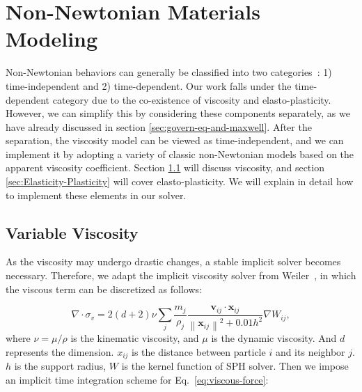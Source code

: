 \documentclass[10pt,journal,compsoc]{IEEEtran}
\begin{document}

\section{Non-Newtonian Materials Modeling}\label{sec:Non-Newtonian model}


Non-Newtonian behaviors can generally be classified into two categories~\cite{Phan2017,Chhabra2010}: 1) time-independent and 2) time-dependent. Our work falls under the time-dependent category due to the co-existence of viscosity and elasto-plasticity. However, we can simplify this by considering these components separately, as we have already discussed in section \ref{sec:govern-eq-and-maxwell}.
After the separation, the viscosity model can be viewed as time-independent, and we can implement it by adopting a variety of classic non-Newtonian models based on the apparent viscosity coefficient. Section \ref{sec:variable-viscosity} will discuss viscosity, and section \ref{sec:Elasticity-Plasticity} will cover elasto-plasticity. We will explain in detail how to implement these elements in our solver.




\subsection{Variable Viscosity}\label{sec:variable-viscosity}


As the viscosity may undergo drastic changes, a stable implicit solver becomes necessary. Therefore, we adapt the implicit viscosity solver from Weiler~\cite{Weiler2018-viscosity}, in which the viscous term can be discretized as follows:


\begin{equation}
	\nabla \cdot \sigma_v= 2(d+2) \nu \sum_j \frac{m_j}{\rho_j} \frac{\mathbf{v}_{i j} \cdot \mathbf{x}_{i j}}{\left\|\mathbf{x}_{i j}\right\|^2+0.01 h^2} \nabla W_{i j}\label{eq:viscous-force},
\end{equation}
where $\nu=\mu / \rho$ is the kinematic viscosity, and $\mu$ is the dynamic viscosity. And $d$ represents the dimension. $x_{ij}$ is the distance between particle $i$ and its neighbor $j$. $h$ is the support radius, $W$ is the kernel function of SPH solver. Then we impose an implicit time integration scheme for Eq.~\ref{eq:viscous-force}:
\end{document}

